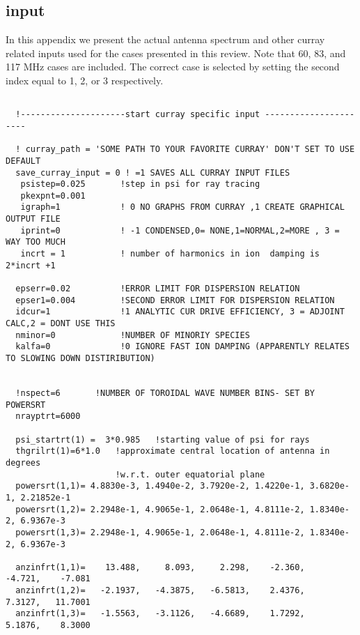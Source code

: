 \subsection{\ct input}\label{ct_input}
  In this appendix we present the actual antenna spectrum and other
  curray related inputs  used for the 
  cases presented in this review.  Note that 60, 83, and 117 MHz cases
 are included. The correct case is selected by setting  the second
 index equal to 1, 2, or 3 respectively.
 \tiny
\begin{verbatim}

  !---------------------start curray specific input ----------------------

  ! curray_path = 'SOME PATH TO YOUR FAVORITE CURRAY' DON'T SET TO USE DEFAULT
  save_curray_input = 0 ! =1 SAVES ALL CURRAY INPUT FILES
   psistep=0.025       !step in psi for ray tracing
   pkexpnt=0.001
   igraph=1            ! 0 NO GRAPHS FROM CURRAY ,1 CREATE GRAPHICAL OUTPUT FILE
   iprint=0            ! -1 CONDENSED,0= NONE,1=NORMAL,2=MORE , 3 = WAY TOO MUCH
   incrt = 1           ! number of harmonics in ion  damping is 2*incrt +1 
  
  epserr=0.02          !ERROR LIMIT FOR DISPERSION RELATION
  epser1=0.004         !SECOND ERROR LIMIT FOR DISPERSION RELATION
  idcur=1              !1 ANALYTIC CUR DRIVE EFFICIENCY, 3 = ADJOINT CALC,2 = DONT USE THIS
  nminor=0             !NUMBER OF MINORIY SPECIES
  kalfa=0              !0 IGNORE FAST ION DAMPING (APPARENTLY RELATES TO SLOWING DOWN DISTIRIBUTION)


  !nspect=6       !NUMBER OF TOROIDAL WAVE NUMBER BINS- SET BY  POWERSRT
  nrayptrt=6000

  psi_startrt(1) =  3*0.985   !starting value of psi for rays
  thgrilrt(1)=6*1.0   !approximate central location of antenna in degrees
                      !w.r.t. outer equatorial plane
  powersrt(1,1)= 4.8830e-3, 1.4940e-2, 3.7920e-2, 1.4220e-1, 3.6820e-1, 2.21852e-1
  powersrt(1,2)= 2.2948e-1, 4.9065e-1, 2.0648e-1, 4.8111e-2, 1.8340e-2, 6.9367e-3
  powersrt(1,3)= 2.2948e-1, 4.9065e-1, 2.0648e-1, 4.8111e-2, 1.8340e-2, 6.9367e-3

  anzinfrt(1,1)=    13.488,     8.093,     2.298,    -2.360,    -4.721,    -7.081
  anzinfrt(1,2)=   -2.1937,   -4.3875,   -6.5813,    2.4376,    7.3127,   11.7001
  anzinfrt(1,3)=   -1.5563,   -3.1126,   -4.6689,    1.7292,    5.1876,    8.3000


\end{verbatim}

